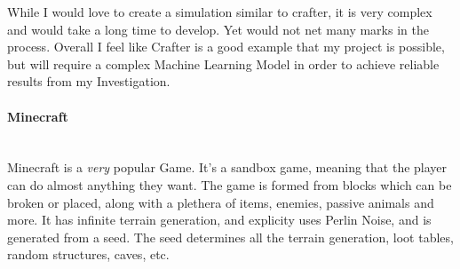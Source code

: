 \begin{flushleft}
                            \vspace{0.4cm}
                            \begin{figure}
                                \centering
                                \qquad
                            \end{figure}
                            \vspace{0.2cm}

                            While I would love to create a simulation similar to crafter, it is very complex and would take a long time to develop. Yet
                            would not net many marks in the process. Overall I feel like Crafter is a good example that my project is possible, but will
                            require a complex Machine Learning Model in order to achieve reliable results from my Investigation.

                        \vspace{1cm}
                    \paragraph{Minecraft} \mbox{} \\
                        \vspace{0.2cm}
                        Minecraft is a \textit{very} popular Game. It's a sandbox game, meaning that the player can do almost anything they want.
                        The game is formed from blocks which can be broken or placed, along with a plethera of items, enemies, passive animals
                        and more. It has infinite terrain generation, and explicity uses Perlin Noise, and is generated from a seed. The seed determines
                        all the terrain generation, loot tables, random structures, caves, etc. \\
                        

\end{flushleft}
